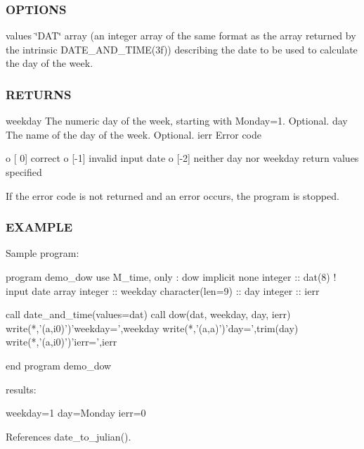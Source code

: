 \subsubsection*{O\+P\+T\+I\+O\+NS}

values \char`\"{}\+D\+A\+T\char`\"{} array (an integer array of the same format as the array returned by the intrinsic D\+A\+T\+E\+\_\+\+A\+N\+D\+\_\+\+T\+I\+M\+E(3f)) describing the date to be used to calculate the day of the week. \subsubsection*{R\+E\+T\+U\+R\+NS}

weekday The numeric day of the week, starting with Monday=1. Optional. day The name of the day of the week. Optional. ierr Error code \begin{DoxyVerb}     o [ 0] correct
     o [-1] invalid input date
     o [-2] neither day nor weekday return values specified

     If the error code is not returned and an error occurs,
     the program is stopped.
\end{DoxyVerb}


\subsubsection*{E\+X\+A\+M\+P\+LE}

\begin{DoxyVerb}Sample program:

 program demo_dow
 use M_time, only : dow
 implicit none
 integer          :: dat(8)     ! input date array
 integer          :: weekday
 character(len=9) :: day
 integer          :: ierr

   call date_and_time(values=dat)
   call dow(dat, weekday, day, ierr)
   write(*,'(a,i0)')'weekday=',weekday
   write(*,'(a,a)')'day=',trim(day)
   write(*,'(a,i0)')'ierr=',ierr

 end program demo_dow

results:

 weekday=1
 day=Monday
 ierr=0 \end{DoxyVerb}
 

References date\+\_\+to\+\_\+julian().

